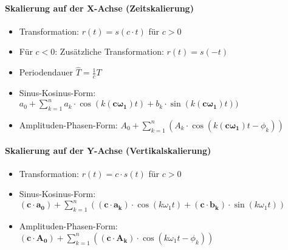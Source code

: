 \paragraph{Skalierung auf der X-Achse (Zeitskalierung)}
\begin{itemize}
  \item Transformation: $r(t) = s(c \cdot t)$ für $c > 0$
  \item Für $c < 0$: Zusätzliche Transformation: $r(t) = s(-t)$
  \item Periodendauer $\hat{T} = \frac{1}{c}T$
  \item Sinus-Kosinus-Form: $a_0 + \sum_{k=1}^{n}
    a_k \cdot \cos(k \boldsymbol{(c \omega_1)} t) +
    b_k \cdot \sin(k \boldsymbol{(c \omega_1)} t))$
  \item Amplituden-Phasen-Form: $A_0 + \sum_{k=1}^{n}
    (A_k \cdot \cos(k \boldsymbol{(c \omega_1)} t  - \phi_k))$
\end{itemize}
\paragraph{Skalierung auf der Y-Achse (Vertikalskalierung)}
\begin{itemize}
  \item Transformation: $r(t) = c \cdot s(t)$ für $c > 0$
  \item Sinus-Kosinus-Form: $\boldsymbol{(c \cdot a_0)} + \sum_{k=1}^{n}
  ( \boldsymbol{(c \cdot a_k)} \cdot \cos(k \omega_1 t) + \boldsymbol{(c
  \cdot b_k)} \cdot \sin(k \omega_1 t))$
  \item Amplituden-Phasen-Form: $\boldsymbol{(c \cdot A_0)} + \sum_{k=1}^{n}
    (\boldsymbol{(c \cdot A_k)} \cdot \cos(k \omega_1 t  - \phi_k))$
\end{itemize}
